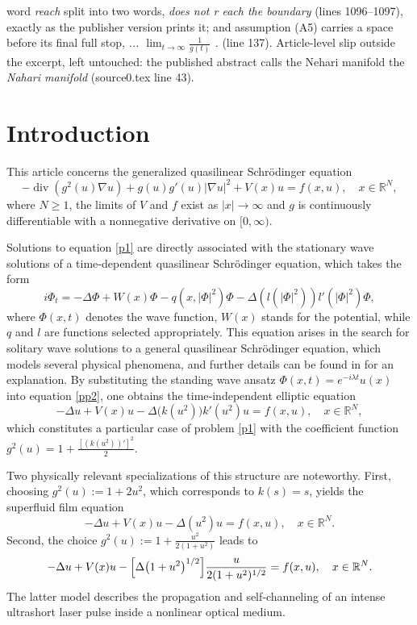 \documentclass[10pt,a4paper]{amsart}
\numberwithin{equation}{section}
\begin{document}
word \emph{reach} split into two words, \emph{does not r each the boundary} (lines 1096--1097), exactly as the publisher version prints it; and assumption (A5) carries a space before its final full stop, \emph{... $\lim_{t\to\infty}\frac{1}{g(t)}$ .} (line 137). Article-level slip outside the excerpt, left untouched: the published abstract calls the Nehari manifold the \emph{Nahari manifold} (source0.tex line 43).
\section{Introduction}

This article concerns the generalized quasilinear Schr\"odinger equation
\begin{equation}
\label{p1}
-\operatorname{div} (g^2(u)\nabla u)+g(u)g'(u)|\nabla u|^2+V(x)u=f(x,u), \quad x\in \mathbb{R}^{N},
\end{equation}
where $N \ge 1$, the limits of $V$ and $f$ exist as $|x| \to \infty$ and $g$  is continuously differentiable with a nonnegative derivative on $[0, \infty)$. 

Solutions to equation \eqref{p1} are directly associated with the stationary wave solutions of a 
time‑dependent quasilinear Schr\"odinger equation, which takes the form
\begin{equation}
\label{pp2}
i\Phi_t=-\Delta \Phi+W(x)\Phi-q(x,|\Phi|^2)\Phi-\Delta(l(|\Phi|^2))l'(|\Phi|^2)\Phi,
\end{equation}
where $\Phi(x,t)$ denotes the wave function, $W(x)$ stands for  the  potential, while $q$ and $l$  
are functions selected appropriately. 
This equation arises in the search for solitary wave solutions to a general quasilinear 
Schr\"odinger equation, which models several physical phenomena, and further details can be 
found in \cite{Wang2, Wang1, Poppenberg} for an explanation. 
By substituting the standing wave ansatz $\Phi(x,t)=e^{-i\lambda t}u(x)$ into equation \eqref{pp2}, 
one obtains the time‑independent elliptic equation
\begin{equation}
\label{p2}
-\Delta u+V(x)u-\Delta\bigl(k(u^2)\bigr)k'(u^2)u=f(x,u), \quad x\in \mathbb{R}^{N},
\end{equation}
which constitutes a particular case of problem \eqref{p1} with the coefficient function 
$g^2(u)=1+\frac{[(k(u^2))']^2}{2}$.

Two physically relevant specializations of this structure are noteworthy.
First, choosing $g^2(u):=1+2u^2$, which corresponds to $k(s)=s$, yields the superfluid film 
equation 
\begin{equation}
\label{p3}
-\Delta u+V(x)u-\Delta(u^{2})u=f(x,u), \quad x\in \mathbb{R}^{N}.
\end{equation}
Second, the choice $g^2(u):=1+\frac{u^2}{2(1+u^2)}$ leads to
\begin{equation}
\label{p4}
-\Delta u+V(x)u-\Bigl[\Delta\bigl(1+u^{2}\bigr)^{1/2}\Bigr]\frac{u}{2(1+u^{2})^{1/2}}=
f(x,u), \quad x\in \mathbb{R}^{N}.
\end{equation}
The latter model describes the propagation and self‑channeling of an intense ultrashort laser 
pulse inside a nonlinear optical medium.
\end{document}
